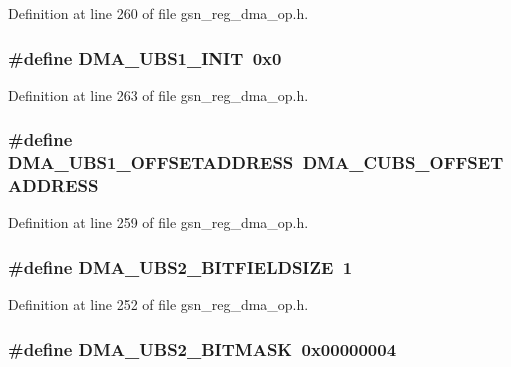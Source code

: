 Definition at line 260 of file gsn\_\-reg\_\-dma\_\-op.h.

\hypertarget{a00547_a6bfc4dcd01d578ce62d107a0b62ef746}{
\subsubsection[{DMA\_\-UBS1\_\-INIT}]{\setlength{\rightskip}{0pt plus 5cm}\#define DMA\_\-UBS1\_\-INIT~0x0}}
\label{a00547_a6bfc4dcd01d578ce62d107a0b62ef746}


Definition at line 263 of file gsn\_\-reg\_\-dma\_\-op.h.

\hypertarget{a00547_aecf79555d74ae18894265e76340d9512}{
\subsubsection[{DMA\_\-UBS1\_\-OFFSETADDRESS}]{\setlength{\rightskip}{0pt plus 5cm}\#define DMA\_\-UBS1\_\-OFFSETADDRESS~DMA\_\-CUBS\_\-OFFSETADDRESS}}
\label{a00547_aecf79555d74ae18894265e76340d9512}


Definition at line 259 of file gsn\_\-reg\_\-dma\_\-op.h.

\hypertarget{a00547_a9f255ee2eb710d462fc908f1c43634b7}{
\subsubsection[{DMA\_\-UBS2\_\-BITFIELDSIZE}]{\setlength{\rightskip}{0pt plus 5cm}\#define DMA\_\-UBS2\_\-BITFIELDSIZE~1}}
\label{a00547_a9f255ee2eb710d462fc908f1c43634b7}


Definition at line 252 of file gsn\_\-reg\_\-dma\_\-op.h.

\hypertarget{a00547_a1b78974148ef350a161c3b9197f213e2}{
\subsubsection[{DMA\_\-UBS2\_\-BITMASK}]{\setlength{\rightskip}{0pt plus 5cm}\#define DMA\_\-UBS2\_\-BITMASK~0x00000004}}
\label{a00547_a1b78974148ef350a161c3b9197f213e2}


